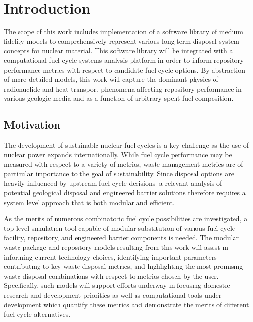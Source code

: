 \chapter{Introduction}\label{ch:introduction}

The scope of this work includes implementation of a software library 
of medium fidelity models to comprehensively represent various long-term 
disposal system concepts for nuclear material. This software library will 
be integrated with a computational fuel cycle systems analysis platform 
in order to inform repository performance metrics with respect to 
candidate fuel cycle options. By abstraction of more detailed models, this 
work will capture the dominant physics of radionuclide and heat transport 
phenomena affecting repository performance in various geologic media and as 
a function of arbitrary spent fuel composition. 

\section{Motivation} 

The development of sustainable nuclear fuel cycles is a key challenge 
as the use of nuclear power expands internationally. While fuel cycle 
performance may be measured with respect to a variety of metrics, 
waste management metrics are of particular importance to the goal of 
sustainability. Since disposal options are heavily influenced by 
upstream fuel cycle decisions, a relevant analysis of potential 
geological disposal and engineered barrier solutions therefore 
requires a system level approach that is both modular and efficient. 

As the merits of numerous combinatoric fuel cycle possibilities are 
investigated, a top-level simulation tool capable of modular 
substitution of various fuel cycle facility, repository, and 
engineered barrier components is needed. The modular waste package and 
repository models resulting from this work will assist in informing 
current technology choices, identifying important parameters 
contributing to key waste disposal metrics, and highlighting the most 
promising waste disposal combinations with respect to metrics chosen by
the user. Specifically, such models will support efforts underway in 
focusing domestic research and development priorities as well as 
computational tools under development which quantify these metrics and 
demonstrate the merits of different fuel cycle alternatives. 

